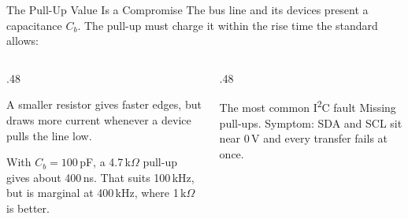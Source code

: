 \documentclass[9pt,aspectratio=169,xcolor=table]{beamer}
\begin{document}
\begin{frame}{The Pull-Up Value Is a Compromise}
    \leavevmode
    The bus line and its devices present a capacitance $C_b$. The pull-up must charge it within the rise time the standard allows:

    \vspace{2mm}
    \begin{center}
    \end{center}

    \vspace{2mm}
    \begin{columns}[T]
    \begin{column}{.48\textwidth}
        {\small A smaller resistor gives faster edges, but draws more current whenever a device pulls the line low.

        \vspace{2mm}
        With $C_b = 100$\,pF, a 4.7\,k$\Omega$ pull-up gives about 400\,ns. That suits 100\,kHz, but is marginal at 400\,kHz, where 1\,k$\Omega$ is better.}
    \end{column}
    \begin{column}{.48\textwidth}
        \begin{block}{The most common I\textsuperscript{2}C fault}
            {\small \alert{Missing pull-ups.} Symptom: SDA and SCL sit near 0\,V and every transfer fails at once.}
        \end{block}
    \end{column}
    \end{columns}
\end{frame}
\end{document}
